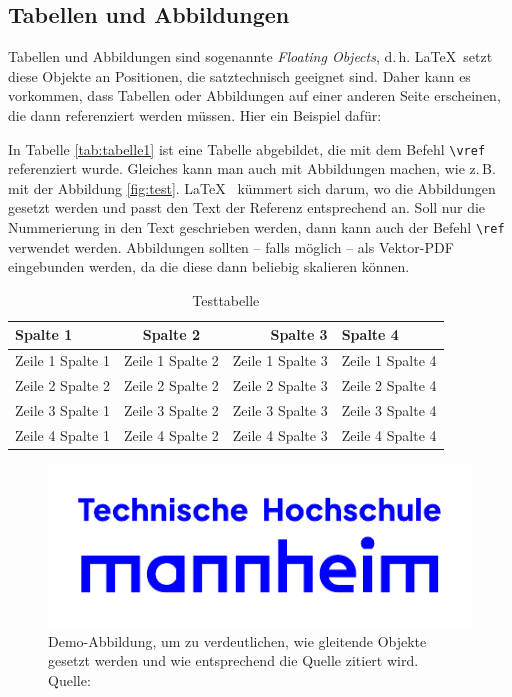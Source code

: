 \subsection{Tabellen und Abbildungen}
Tabellen und Abbildungen sind sogenannte \textit{Floating Objects}, d.\,h. \LaTeX\ setzt diese Objekte an Positionen, die satztechnisch geeignet sind. Daher kann es vorkommen, dass Tabellen oder Abbildungen auf einer anderen Seite erscheinen, die dann referenziert werden müssen. Hier ein Beispiel dafür: 

In Tabelle \vref{tab:tabelle1} ist eine Tabelle abgebildet, die mit dem Befehl \texttt{\textbackslash vref} referenziert wurde. Gleiches kann man auch mit Abbildungen 
machen, wie z.\,B. mit der Abbildung \vref{fig:test}. \LaTeX~ kümmert sich darum, wo die Abbildungen gesetzt werden und passt den Text der Referenz entsprechend an. Soll nur die Nummerierung in den Text geschrieben werden, dann kann auch der Befehl \texttt{\textbackslash ref} verwendet werden.
Abbildungen sollten -- falls möglich -- als Vektor-PDF eingebunden 
werden, da die diese dann beliebig skalieren können.

\begin{table}
	\centering
	\begin{tabular}{p{3cm}crl}
		\textbf{Spalte 1} & \textbf{Spalte 2} & \textbf{Spalte 3} & \textbf{Spalte 4}\\\toprule
		Zeile 1 Spalte 1 &  Zeile 1 Spalte 2 & Zeile 1 Spalte 3 & Zeile 1 Spalte 4\\
		Zeile 2 Spalte 2 &  Zeile 2 Spalte 2 & Zeile 2 Spalte 3 & Zeile 2 Spalte 4\\\midrule
		Zeile 3 Spalte 1 &  Zeile 3 Spalte 2 & Zeile 3 Spalte 3 & Zeile 3 Spalte 4\\
		Zeile 4 Spalte 1 &  Zeile 4 Spalte 2 & Zeile 4 Spalte 3 & Zeile 4 Spalte 4\\\bottomrule
	\end{tabular}
	\caption[Testtabelle]{\label{tab:tabelle1}Testtabelle}
\end{table}

\begin{figure}
	\centering 
	\includegraphics[scale=1]{img/thmannheimlogo.pdf}
	\captionsetup{format=hang}
	\caption[Optionaler Kurztitel für das Abbildunggsverzeichnis]{\label{fig:test}Demo-Abbildung, um zu verdeutlichen, wie gleitende Objekte gesetzt werden und wie entsprechend die Quelle zitiert wird. \\Quelle: \cite[][S. 223]{TD15}}
\end{figure}
	
